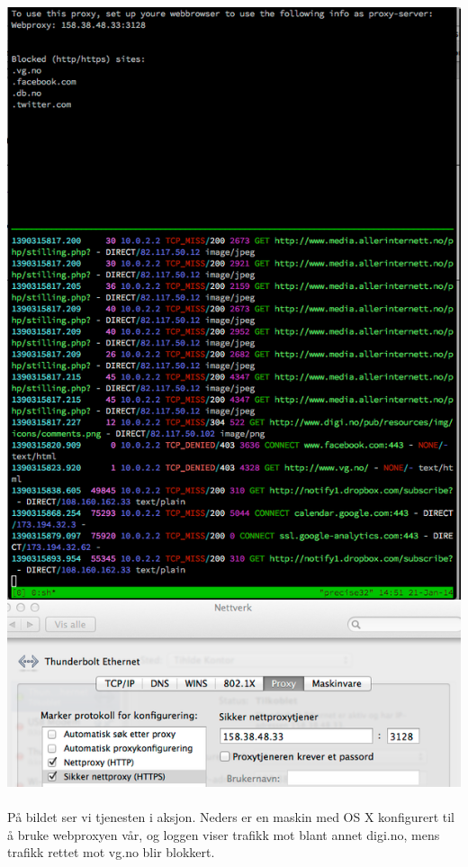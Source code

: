 \documentclass{article}
\begin{document}
\includegraphics[scale = 0.5]{pictures/proxy.png}
\\ \\
På bildet ser vi tjenesten i aksjon. Neders er en maskin med OS X konfigurert til å bruke webproxyen vår, og loggen viser trafikk mot blant annet digi.no, mens trafikk rettet mot vg.no blir blokkert. 
\end{document}
